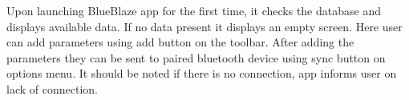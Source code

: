 Upon launching BlueBlaze app for the first time, it checks the database and displays available data. If no data present it displays an empty screen. Here user can add parameters using add button on the toolbar. After adding the parameters they can be sent to paired bluetooth device using sync button on options menu. It should be noted if there is no connection, app informs user on lack of connection. 











